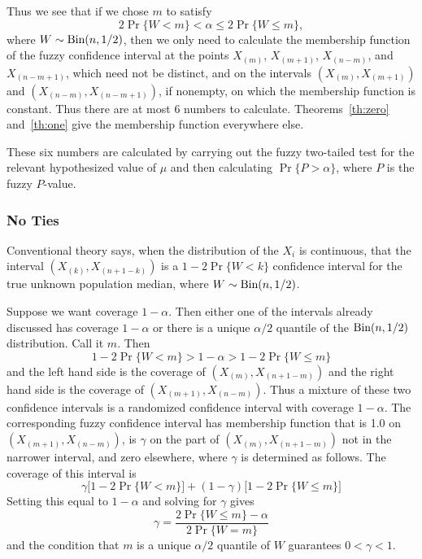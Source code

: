 \documentclass{article}
\newcommand{\BinomialDis}{\text{\upshape Bin}}
\begin{document}
Thus we see that if we chose $m$ to satisfy
\begin{equation} \label{quantile}
   2 \Pr \{ W < m \} < \alpha \le 2 \Pr \{ W \le m \},
\end{equation}
where $W \sim \BinomialDis(n, 1 / 2)$, then we only need to calculate
the membership function of the fuzzy confidence interval at the points
$X_{(m)}$, $X_{(m + 1)}$, $X_{(n - m)}$, and $X_{(n - m + 1)}$,
which need not be distinct, and on the intervals
$(X_{(m)}, X_{(m + 1)})$ and $(X_{(n - m)}, X_{(n - m + 1)})$,
if nonempty, on which the membership function is constant.
Thus there are at most 6 numbers to calculate.  Theorems~\ref{th:zero}
and~\ref{th:one} give the membership function everywhere else.

These six numbers are calculated by carrying out the fuzzy two-tailed test
for the relevant hypothesized value of $\mu$ and then
calculating $\Pr \{ P > \alpha \}$, where $P$ is the fuzzy $P$-value.

\subsubsection{No Ties}

Conventional theory says, when the distribution of the $X_i$ is continuous,
that the interval $(X_{(k)}, X_{(n + 1 - k)})$ is a
$1 - 2 \Pr\{ W < k \}$ confidence interval for the true unknown population
median, where $W \sim \BinomialDis(n, 1 / 2)$.

Suppose we want coverage $1 - \alpha$.  Then either one of the intervals
already discussed has coverage $1 - \alpha$ or there is a unique
$\alpha / 2$ quantile of the $\BinomialDis(n, 1 / 2)$ distribution.
Call it $m$.  Then
$$
   1 - 2 \Pr \{ W < m \} > 1 - \alpha > 1 - 2 \Pr \{ W \le m \}
$$
and the left hand side is the coverage of $(X_{(m)}, X_{(n + 1 - m)})$
and the right hand side is the coverage of $(X_{(m + 1)}, X_{(n - m)})$.
Thus a mixture of these two confidence intervals is a randomized confidence
interval with coverage $1 - \alpha$.  The corresponding fuzzy confidence
interval has membership function that is 1.0 on $(X_{(m + 1)}, X_{(n - m)})$,
is $\gamma$ on the part
of $(X_{(m)}, X_{(n + 1 - m)})$ not in the narrower interval,
and zero elsewhere, where $\gamma$ is determined as follows.
The coverage of this interval is
$$
   \gamma  \bigl[ 1 - 2 \Pr \{ W < m \} \bigr]
   + (1 - \gamma) \bigl[ 1 - 2 \Pr \{ W \le m \} \bigr]
$$
Setting this equal to $1 - \alpha$ and solving for $\gamma$ gives
\begin{equation} \label{gamma}
   \gamma = \frac{2 \Pr \{ W \le m \} - \alpha}{2 \Pr \{ W = m \}}
\end{equation}
and
the condition that $m$ is a unique $\alpha / 2$ quantile of $W$ guarantees
$0 < \gamma < 1$.
\end{document}
